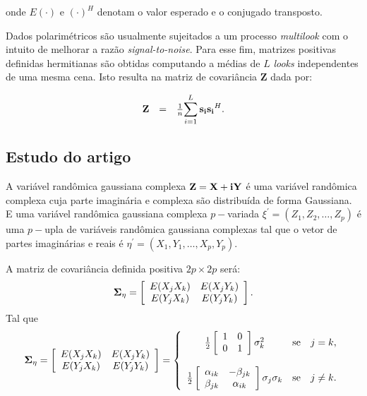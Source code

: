 \documentclass[10pt,a4paper]{article}
\begin{document}
onde $E(\cdot)$ e $(\cdot)^H$ denotam o valor esperado e o conjugado transposto.

Dados polarimétricos são usualmente sujeitados a um processo {\it multilook} com o intuito de melhorar a razão {\it signal-to-noise}. Para esse fim, matrizes positivas definidas hermitianas são obtidas computando a médias de $L$ {\it looks} independentes de uma mesma cena. Isto resulta na matriz de covariância {\bf Z} dada por:

\begin{equation}\label{sec1eqn3}
\begin{array}{ccc}
	{\bf Z}&=&\frac{1}{n}\displaystyle{\sum_{i=1}^{L} {\bf s_i}{\bf s_i}^H} . \\
\end{array}
\end{equation}

\subsection{Estudo do artigo  \cite{goodman1963}}


A variável randômica gaussiana complexa ${\bf Z=X+iY}$ é uma variável randômica complexa cuja parte imaginária e complexa são distribuída de forma Gaussiana.  E uma variável randômica gaussiana complexa $p-$variada $\xi^{'}=(Z_1,Z_2,\dots,Z_p)$ é uma $p-$upla  de variáveis randômica gaussiana complexas tal que o vetor de partes imaginárias e reais é $\eta^{'}=(X_1,Y_1,\dots,X_p,Y_p)$.

A matriz de covariância definida positiva $2p\times 2p$ será:
$$
{\bf \Sigma_{\eta}} = \left[
\begin{array}{cc}
	E(X_jX_k)  & E(X_jY_k)  \\
	E(Y_jX_k)  & E(Y_jY_k)  \\
\end{array}
\right].
$$
Tal que
$$
{\bf \Sigma_{\eta}} = \left[
\begin{array}{cc}
	E(X_jX_k)  & E(X_jY_k)  \\
	E(Y_jX_k)  & E(Y_jY_k)  \\
\end{array}
\right]= \left\{
\begin{array}{cc}
	\frac{1}{2}\left[
\begin{array}{cc}
	 1 & 0  \\
	 0 & 1  \\
\end{array}
	\right]\sigma^{2}_{k}  & \mbox{se}\quad j=k, \\
	& \\
	\frac{1}{2}\left[
\begin{array}{cc}
	\alpha_{ik} & -\beta_{jk}  \\
	 \beta_{jk} & \alpha_{ik}  \\
\end{array}
	\right]\sigma_j\sigma_k  & \mbox{se}\quad j\neq k.   \\
\end{array}
\right.
$$
\end{document}
